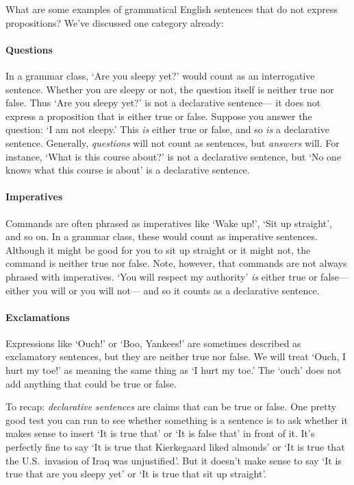 What are some examples of grammatical English sentences that do not express propositions?
We've discussed one category already:

\paragraph{Questions} In a grammar class, `Are you sleepy yet?' would count as an interrogative sentence.
Whether you are sleepy or not, the question itself is neither true nor false.
Thus `Are you sleepy yet?' is not a declarative sentence--- it does not express a proposition that is either true or false.
Suppose you answer the question: `I am not sleepy.'
This \emph{is} either true or false, and so \emph{is} a declarative sentence.
Generally, \emph{questions} will not count as sentences, but \emph{answers} will. 
For instance, `What is this course about?' is not a declarative sentence, but `No one knows what this course is about' is a declarative sentence.

\paragraph{Imperatives} Commands are often phrased as imperatives like `Wake up!', `Sit up straight', and so on.
In a grammar class, these would count as imperative sentences.
Although it might be good for you to sit up straight or it might not, the command is neither true nor false.
Note, however, that commands are not always phrased with imperatives.
`You will respect my authority' \emph{is} either true or false--- either you will or you will not--- and so it counts as a declarative sentence.

\paragraph{Exclamations} Expressions like `Ouch!' or `Boo, Yankees!' are sometimes described as exclamatory sentences, but they are neither true nor false.
We will treat `Ouch, I hurt my toe!' as meaning the same thing as `I hurt my toe.'
The `ouch' does not add anything that could be true or false.

To recap: \emph{declarative sentences} are claims that can be true or false.
One pretty good test you can run to see whether something is a sentence is to ask whether it makes sense to insert `It is true that' or `It is false that' in front of it.
It's perfectly fine to say `It is true that Kierkegaard liked almonds' or `It is true that the U.S.\ invasion of Iraq was unjustified'.
But it doesn't make sense to say `It is true that are you sleepy yet' or `It is true that sit up straight'.






